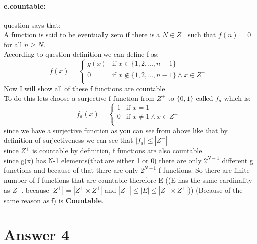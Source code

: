 \documentclass[11pt]{article}
\begin{document}
\paragraph{e.countable:} 
question says that:\\
A function is said to be eventually zero if there is a $N \in Z^{+}$ such that $f(n) = 0$ for all $n \geq N$.\\
According to question definition we can define f as:\\
\begin{equation}
   f(x)= 
    \begin{cases}
        g(x) & \text{if $x\in\{1,2,...,n-1\}$} \\
        0 & \text{if $x\notin\{1,2,...,n-1\}\land x\in Z^{+}$} \\
    \end{cases}
\end{equation}
Now I will show all of these f functions are countable\\
To do this lets choose a surjective f function from $Z^{+}$ to $\{0,1\}$ called $f_a$ which is:\\ 
\begin{equation}
   f_a(x)= 
    \begin{cases}
        1 & \text{if $x=1$} \\
        0 & \text{if $x\neq 1\land x\in Z^{+}$} \\
    \end{cases}
\end{equation}
since we have a surjective function as you can see from above like that by definition of surjectiveness we can see that $|f_a|\leq|Z^{+}|$\\
since $Z^{+}$ is countable by definition, f functions are also countable.\\
since g(x) has N-1 elements(that are either 1 or 0) there are only $2^{N-1}$ different g functions and because of that there are only $2^{N-1}$ f functions. So there are finite number of f functions that are countable therefore E ((E has the same cardinality as $Z^{+}$. because $|Z^{+}|=|Z^{+}\times Z^{+}|$ and $|Z^{+}|\leq |E|\leq|Z^{+}\times Z^{+}|$)) (Because of the same reason as f) is \textbf{Countable}.\\





\section*{Answer 4}
\end{document}
